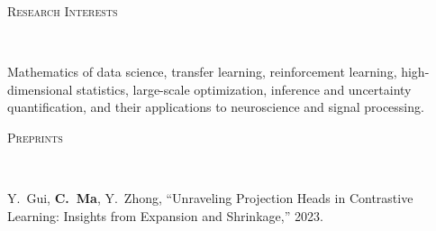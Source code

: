 \documentclass[a4paper, 10pt]{article}
\newenvironment{changemargin}[2]{%
  \begin{list}{}{%
    \setlength{\topsep}{0pt}%
    \setlength{\leftmargin}{#1}%
    \setlength{\rightmargin}{#2}%
    \setlength{\listparindent}{\parindent}%
    \setlength{\itemindent}{\parindent}%
    \setlength{\parsep}{\parskip}%
  }%
  \item[]}{\end{list}
}
\newcommand{\lineover}{
	\begin{changemargin}{-0.05in}{-0.05in}
		\vspace*{-8pt}
		\hrulefill \\
		\vspace*{-2pt}
	\end{changemargin}
}
\newcommand{\header}[1]{
	\begin{changemargin}{-0.5in}{-0.5in}
		\scshape{#1}\\
  	\lineover
	\end{changemargin}
}
\newenvironment{body} {
	\vspace*{-16pt}
	\begin{changemargin}{-0.3in}{-0.5in}
  }	
	{\end{changemargin}
}
\begin{document}
\bigskip
\header{\LARGE{Research Interests}}
\begin{body}
\vspace{18pt}
Mathematics of data science, transfer learning, reinforcement learning, high-dimensional statistics, large-scale optimization, inference and uncertainty quantification, and their applications to neuroscience and signal processing.
\end{body}



\bigskip
\header{\LARGE{Preprints}}
\begin{body}
	\vspace{18pt}
	\begin{enumerate}[label={[{P}{{\arabic*}}]}]


\item Y.~Gui, \textbf{C.~Ma}, Y.~Zhong, ``Unraveling Projection Heads in Contrastive Learning: Insights from Expansion and Shrinkage,'' 2023.











	\end{enumerate}
\end{body}
\end{document}
